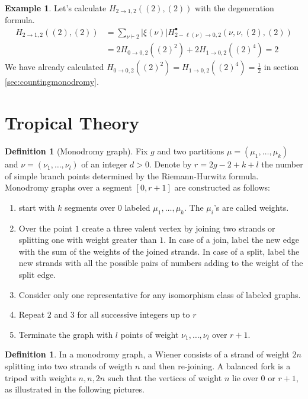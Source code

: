 \documentclass[12pt,a4paper,openright,twoside]{report}
\theoremstyle{definition} %
\newtheorem{definition}[theorem]{Definition}
\newtheorem{example}[theorem]{Example}
\begin{document}
\begin{example}
    Let's calculate \(H_{2 \to 1,2}((2),(2))\) with the degeneration formula.
    \begin{align*}
    H_{2 \to 1,2}((2),(2)) &= \sum_{\nu \vdash 2}|\xi(\nu)|H^{\bullet}_{2-\ell(\nu) \to 0,2}(\nu,\nu, (2),(2)) \\
    &= 2 H_{0 \to 0,2}((2)^2) + 2 H_{1 \to 0,2}((2)^4) = 2
    \end{align*}
    We have already calculated \(H_{0 \to 0,2}((2)^2) = H_{1 \to 0,2}((2)^4) = \frac{1}{2}\) in section \ref{sec:countingmonodromy}.
\end{example}

\section{Tropical Theory}

\begin{definition}[Monodromy graph]
    Fix \(g\) and two partitions \(\mu = (\mu_1, \ldots, \mu_k)\) and \(\nu=(\nu_1, \ldots, \nu_l)\) of an integer \(d > 0\). Denote by \(r = 2g-2 + k + l\) the number of simple branch points determined by the Riemann-Hurwitz formula. Monodromy graphs over a segment \([0,r+1]\) are constructed as follows:
    \begin{enumerate}
        \item start with \(k\) segments over \(0\) labeled \(\mu_1, \ldots, \mu_k\). The \(\mu_i\)'s are called weights.
        \item Over the point \(1\) create a three valent vertex by joining two strands or splitting one with weight greater than \(1\). In case of a join, label the new edge with the sum of the weights of the joined strands. In case of a split, label the new strands with all the possible pairs of numbers adding to the weight of the split edge.
        \item Consider only one representative for any isomorphism class of labeled graphs.
        \item Repeat \(2\) and \(3\) for all successive integers up to \(r\)
        \item Terminate the graph with \(l\) points of weight \(\nu_1, \ldots, \nu_l\) over \(r+1\).
    \end{enumerate}
\end{definition}

\begin{definition}
    In a monodromy graph, a Wiener consists of a strand of weight \(2n\) splitting into two strands of weigth \(n\) and then re-joining. A balanced fork is a tripod with weights \(n, n, 2n\) such that the vertices of weight \(n\) lie over \(0\) or \(r+1\), as illustrated in the following pictures.
\end{definition}
\end{document}
